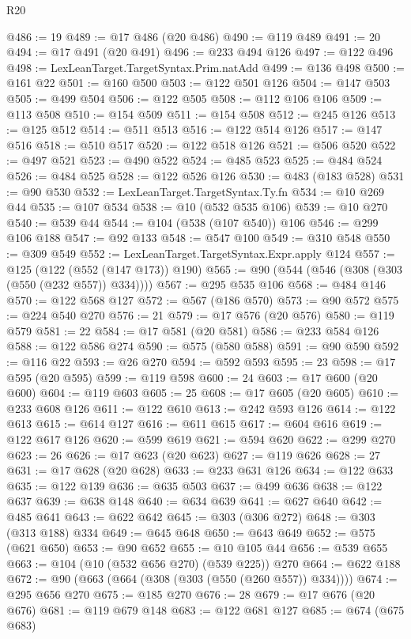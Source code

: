 \begin{lexlean}{R20}
\begin{coremodule}
@486 := 19
@489 := @17 @486 (@20 @486)
@490 := @119 @489
@491 := 20
@494 := @17 @491 (@20 @491)
@496 := @233 @494 @126
@497 := @122 @496
@498 := LexLeanTarget.TargetSyntax.Prim.natAdd
@499 := @136 @498
@500 := @161 @22
@501 := @160 @500
@503 := @122 @501 @126
@504 := @147 @503
@505 := @499 @504
@506 := @122 @505
@508 := @112 @106 @106
@509 := @113 @508
@510 := @154 @509
@511 := @154 @508
@512 := @245 @126
@513 := @125 @512
@514 := @511 @513
@516 := @122 @514 @126
@517 := @147 @516
@518 := @510 @517
@520 := @122 @518 @126
@521 := @506 @520
@522 := @497 @521
@523 := @490 @522
@524 := @485 @523
@525 := @484 @524
@526 := @484 @525
@528 := @122 @526 @126
@530 := @483 (@183 @528)
@531 := @90 @530
@532 := LexLeanTarget.TargetSyntax.Ty.fn
@534 := @10 @269 @44
@535 := @107 @534
@538 := @10 (@532 @535 @106)
@539 := @10 @270
@540 := @539 @44
@544 := @104 (@538 (@107 @540)) @106
@546 := @299 @106 @188
@547 := @92 @133
@548 := @547 @100
@549 := @310 @548
@550 := @309 @549
@552 := LexLeanTarget.TargetSyntax.Expr.apply @124
@557 := @125 (@122 (@552 (@147 @173)) @190)
@565 := @90 (@544 (@546 (@308 (@303 (@550 (@232 @557)) @334))))
@567 := @295 @535 @106
@568 := @484 @146
@570 := @122 @568 @127
@572 := @567 (@186 @570)
@573 := @90 @572
@575 := @224 @540 @270
@576 := 21
@579 := @17 @576 (@20 @576)
@580 := @119 @579
@581 := 22
@584 := @17 @581 (@20 @581)
@586 := @233 @584 @126
@588 := @122 @586 @274
@590 := @575 (@580 @588)
@591 := @90 @590
@592 := @116 @22
@593 := @26 @270
@594 := @592 @593
@595 := 23
@598 := @17 @595 (@20 @595)
@599 := @119 @598
@600 := 24
@603 := @17 @600 (@20 @600)
@604 := @119 @603
@605 := 25
@608 := @17 @605 (@20 @605)
@610 := @233 @608 @126
@611 := @122 @610
@613 := @242 @593 @126
@614 := @122 @613
@615 := @614 @127
@616 := @611 @615
@617 := @604 @616
@619 := @122 @617 @126
@620 := @599 @619
@621 := @594 @620
@622 := @299 @270
@623 := 26
@626 := @17 @623 (@20 @623)
@627 := @119 @626
@628 := 27
@631 := @17 @628 (@20 @628)
@633 := @233 @631 @126
@634 := @122 @633
@635 := @122 @139
@636 := @635 @503
@637 := @499 @636
@638 := @122 @637
@639 := @638 @148
@640 := @634 @639
@641 := @627 @640
@642 := @485 @641
@643 := @622 @642
@645 := @303 (@306 @272)
@648 := @303 (@313 @188) @334
@649 := @645 @648
@650 := @643 @649
@652 := @575 (@621 @650)
@653 := @90 @652
@655 := @10 @105 @44
@656 := @539 @655
@663 := @104 (@10 (@532 @656 @270) (@539 @225)) @270
@664 := @622 @188
@672 := @90 (@663 (@664 (@308 (@303 (@550 (@260 @557)) @334))))
@674 := @295 @656 @270
@675 := @185 @270
@676 := 28
@679 := @17 @676 (@20 @676)
@681 := @119 @679 @148
@683 := @122 @681 @127
@685 := @674 (@675 @683)

\end{coremodule}
\end{lexlean}
